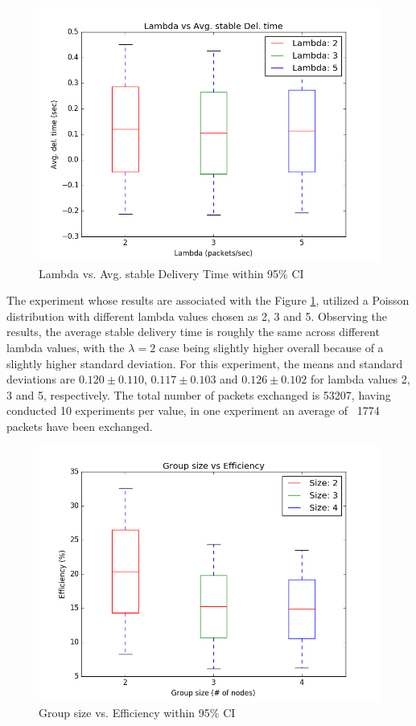 \documentclass[a4paper, 12pt]{article}
\begin{document}
\begin{figure}[h]
\centering
   \includegraphics[scale=0.45]{Lamda_vs_AvgDT_Real.png}
   \caption{Lambda vs. Avg. stable Delivery Time within 95\% CI}
   \label{lbvsavg}
\end{figure}

The experiment whose results are associated with the Figure \ref{lbvsavg}, utilized a Poisson distribution with different lambda values chosen as 2, 3 and 5. Observing the results, the average stable delivery time is roughly the same across different lambda values, with the $\lambda = 2$ case being slightly higher overall because of a slightly higher standard deviation. For this experiment, the means and standard deviations are $0.120 \pm 0.110$, $0.117 \pm 0.103$ and $0.126 \pm 0.102$ for lambda values 2, 3 and 5, respectively. The total number of packets exchanged is 53207, having conducted 10 experiments per value, in one experiment an average of ~1774 packets have been exchanged.

\begin{figure}[h]
\centering
   \includegraphics[scale=0.45]{GS_vs_Eff_Real.png}
   \caption{Group size vs. Efficiency within 95\% CI}
   \label{gsvseff}
\end{figure}
\end{document}
